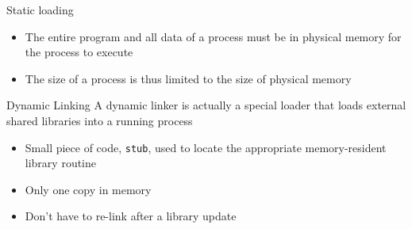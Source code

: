 \begin{frame}{Static loading}
  \begin{itemize}
  \item The entire program and all data of a process must be in physical memory for the
    process to execute
  \item The size of a process is thus limited to the size of physical memory
  \end{itemize}
  \begin{center}
  \end{center}
\end{frame}


\begin{frame}{Dynamic Linking}
  A \alert{dynamic linker} is actually a special loader that loads external shared
  libraries into a running process
  \begin{itemize}
  \item Small piece of code, \texttt{stub}, used to locate the appropriate memory-resident
    library routine
  \item Only one copy in memory
  \item Don't have to re-link after a library update
  \end{itemize}
  \begin{center}
  \end{center}
\end{frame}

